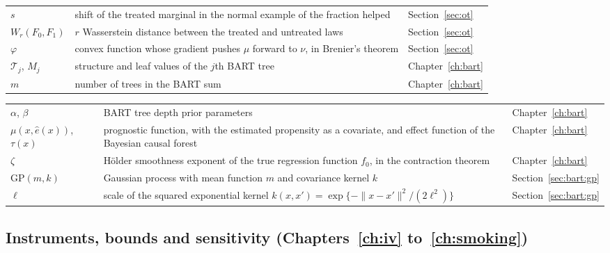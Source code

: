 {\noindent\small\centering
\setlength{\tabcolsep}{4pt}\renewcommand{\arraystretch}{1.1}
\begin{tabular}{>{\raggedright\arraybackslash}p{1.0in}>{\raggedright\arraybackslash}p{2.15in}>{\raggedright\arraybackslash}p{0.95in}}
$s$ & shift of the treated marginal in the normal example of the fraction helped & Section~\ref{sec:ot} \\
$W_r(F_0, F_1)$ & $r$ Wasserstein distance between the treated and untreated laws & Section~\ref{sec:ot} \\
$\varphi$ & convex function whose gradient pushes $\mu$ forward to $\nu$, in Brenier's theorem & Section~\ref{sec:ot} \\
$\mathcal{T}_j$, $M_j$ & structure and leaf values of the $j$th BART tree & Chapter~\ref{ch:bart} \\
$m$ & number of trees in the BART sum & Chapter~\ref{ch:bart} \\
\end{tabular}\par}

{\noindent\small\centering
\setlength{\tabcolsep}{4pt}\renewcommand{\arraystretch}{1.1}
\begin{tabular}{>{\raggedright\arraybackslash}p{1.0in}>{\raggedright\arraybackslash}p{2.15in}>{\raggedright\arraybackslash}p{0.95in}}
$\alpha$, $\beta$ & BART tree depth prior parameters & Chapter~\ref{ch:bart} \\
$\mu(x, \hat e(x))$, $\tau(x)$ & prognostic function, with the estimated propensity as a covariate, and effect function of the Bayesian causal forest & Chapter~\ref{ch:bart} \\
$\zeta$ & H\"older smoothness exponent of the true regression function $f_0$, in the contraction theorem & Chapter~\ref{ch:bart} \\
$\mathrm{GP}(m, k)$ & Gaussian process with mean function $m$ and covariance kernel $k$ & Section~\ref{sec:bart:gp} \\
$\ell$ & scale of the squared exponential kernel $k(x, x') = \exp\{-\|x - x'\|^2/(2\ell^2)\}$ & Section~\ref{sec:bart:gp} \\
\bottomrule
\end{tabular}\par}

\subsection*{Instruments, bounds and sensitivity (Chapters~\ref{ch:iv} to~\ref{ch:smoking})}

